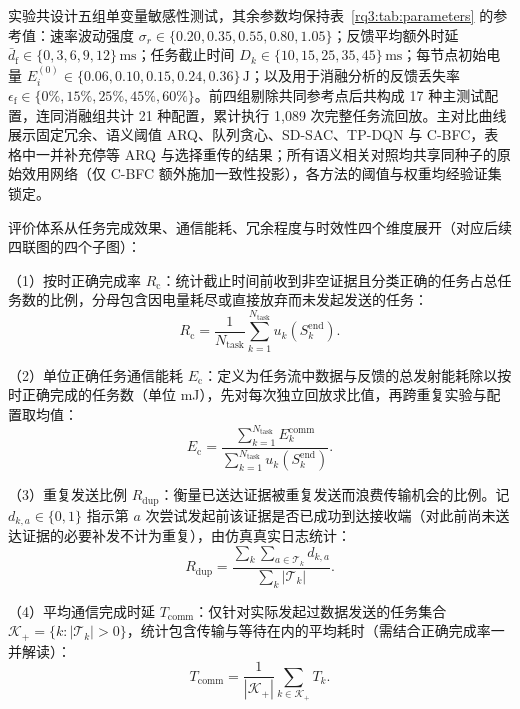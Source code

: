 实验共设计五组单变量敏感性测试，其余参数均保持表~\ref{rq3:tab:parameters} 的参考值：速率波动强度 $\sigma_r\in\{0.20, 0.35, 0.55, 0.80, 1.05\}$；反馈平均额外时延 $\bar d_{\mathrm f}\in\{0, 3, 6, 9, 12\}\,\mathrm{ms}$；任务截止时间 $D_k\in\{10, 15, 25, 35, 45\}\,\mathrm{ms}$；每节点初始电量 $E_i^{(0)}\in\{0.06, 0.10, 0.15, 0.24, 0.36\}\,\mathrm{J}$；以及用于消融分析的反馈丢失率 $\epsilon_{\mathrm f}\in\{0\%, 15\%, 25\%, 45\%, 60\%\}$。前四组剔除共同参考点后共构成 17 种主测试配置，连同消融组共计 21 种配置，累计执行 1,089 次完整任务流回放。主对比曲线展示固定冗余、语义阈值 ARQ、队列贪心、SD-SAC、TP-DQN 与 C-BFC，表格中一并补充停等 ARQ 与选择重传的结果；所有语义相关对照均共享同种子的原始效用网络（仅 C-BFC 额外施加一致性投影），各方法的阈值与权重均经验证集锁定。

评价体系从任务完成效果、通信能耗、冗余程度与时效性四个维度展开（对应后续四联图的四个子图）：

（1）按时正确完成率 $R_{\mathrm c}$：统计截止时间前收到非空证据且分类正确的任务占总任务数的比例，分母包含因电量耗尽或直接放弃而未发起发送的任务：
\begin{equation}
  R_{\mathrm c}=\frac{1}{N_{\mathrm{task}}}\sum_{k=1}^{N_{\mathrm{task}}} u_k(S_k^{\mathrm{end}}).
  \label{rq3:eq:metric-correct}
\end{equation}

（2）单位正确任务通信能耗 $E_{\mathrm c}$：定义为任务流中数据与反馈的总发射能耗除以按时正确完成的任务数（单位 mJ），先对每次独立回放求比值，再跨重复实验与配置取均值：
\begin{equation}
  E_{\mathrm c}=\frac{\sum_{k=1}^{N_{\mathrm{task}}} E_k^{\mathrm{comm}}}
                         {\sum_{k=1}^{N_{\mathrm{task}}} u_k(S_k^{\mathrm{end}})}.
  \label{rq3:eq:metric-energy}
\end{equation}

（3）重复发送比例 $R_{\mathrm{dup}}$：衡量已送达证据被重复发送而浪费传输机会的比例。记 $d_{k,a}\in\{0,1\}$ 指示第 $a$ 次尝试发起前该证据是否已成功到达接收端（对此前尚未送达证据的必要补发不计为重复），由仿真真实日志统计：
\begin{equation}
  R_{\mathrm{dup}}=\frac{\sum_k\sum_{a\in\mathcal T_k}d_{k,a}}
                         {\sum_k|\mathcal T_k|}.
  \label{rq3:eq:metric-duplicate}
\end{equation}

（4）平均通信完成时延 $T_{\mathrm{comm}}$：仅针对实际发起过数据发送的任务集合 $\mathcal K_+=\{k:|\mathcal T_k|>0\}$，统计包含传输与等待在内的平均耗时（需结合正确完成率一并解读）：
\begin{equation}
  T_{\mathrm{comm}}=\frac{1}{|\mathcal K_+|}\sum_{k\in\mathcal K_+}T_k.
  \label{rq3:eq:metric-latency}
\end{equation}

